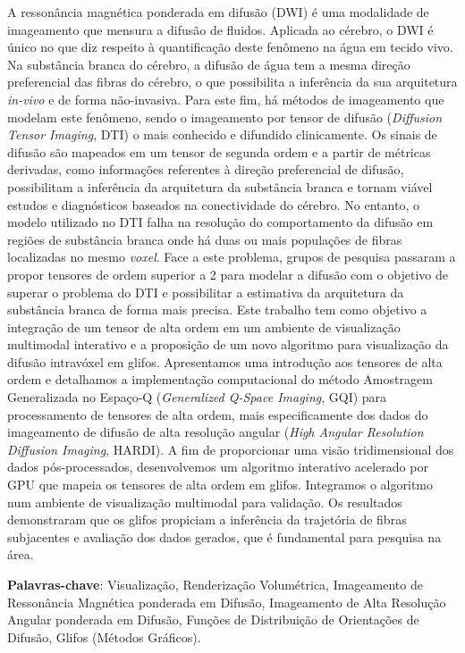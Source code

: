 \documentclass[
    12pt,                %
    oneside,            %
    a4paper,            %
    english,            %
    french,                %
    spanish,            %
    brazil                %
    ]{abntex2}
\begin{document}
\setlength{\absparsep}{18pt} %
\begin{resumo}

A ressonância magnética ponderada em difusão (DWI) é uma modalidade de imageamento que mensura a difusão de fluidos. Aplicada ao cérebro, o DWI é único no que diz respeito à quantificação deste fenômeno na água em tecido vivo. Na substância branca do cérebro, a difusão de água tem a mesma direção preferencial das fibras do cérebro, o que possibilita a inferência da sua arquitetura \textit{in-vivo} e de forma não-invasiva. Para este fim, há métodos de imageamento que modelam este fenômeno, sendo o imageamento por tensor de difusão (\textit{Diffusion Tensor Imaging}, DTI) o mais conhecido e difundido clinicamente. Os sinais de difusão são mapeados em um tensor de segunda ordem e a partir de métricas derivadas, como informações referentes à direção preferencial de difusão, possibilitam a inferência da arquitetura da substância branca e tornam viável estudos e diagnósticos baseados na conectividade do cérebro. No entanto, o modelo utilizado no DTI falha na resolução do comportamento da difusão em regiões de substância branca onde há duas ou mais populações de fibras localizadas no mesmo \textit{voxel}. Face a este problema, grupos de pesquisa passaram a propor tensores de ordem superior a 2 para modelar a difusão com o objetivo de superar o problema do DTI e possibilitar a estimativa da arquitetura da substância branca de forma mais precisa. Este trabalho tem como objetivo a integração de um tensor de alta ordem em um ambiente de visualização multimodal interativo e a proposição de um novo algoritmo para visualização da difusão intravóxel em glifos. Apresentamos uma introdução aos tensores de alta ordem  e detalhamos a implementação computacional do método Amostragem Generalizada no Espaço-Q (\textit{Generalized Q-Space Imaging}, GQI) para processamento de tensores de alta ordem, mais especificamente dos dados do imageamento de difusão de alta resolução angular (\textit{High Angular Resolution Diffusion Imaging}, HARDI). A fim de proporcionar uma visão tridimensional dos dados pós-processados, desenvolvemos um algoritmo interativo acelerado por GPU que mapeia os tensores de alta ordem em glifos. Integramos o algoritmo num ambiente de visualização multimodal para validação. Os resultados demonstraram que os glifos propiciam a inferência da trajetória de fibras subjacentes e avaliação dos dados gerados, que é fundamental para pesquisa na área.


\vspace{\onelineskip}
\noindent\textbf{Palavras-chave}: Visualização, Renderização Volumétrica, Imageamento de Ressonância Magnética ponderada em Difusão, Imageamento de Alta Resolução Angular ponderada em Difusão, Funções de Distribuição de Orientações de Difusão, Glifos (Métodos Gráficos).
\end{resumo}
\end{document}
